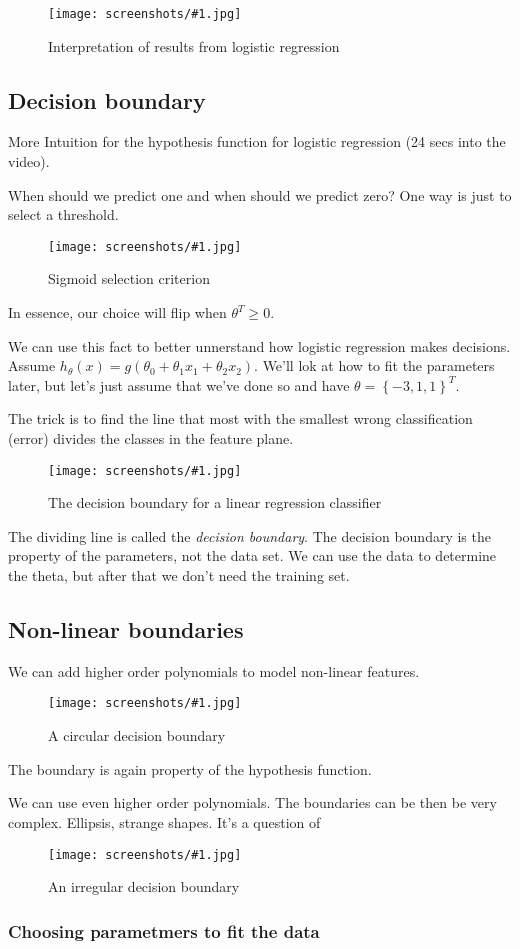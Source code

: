 \documentclass[a4, 12pt, english, USenglish]{scrreprt}
\newcommand{\zcreenshot}[3]{
\begin{figure}[htb]
\texttt{[image: screenshots/\#1.jpg]}
\label{#1}
\caption{#2}
\end{figure}}
\newcommand{\screenshot}[2]{
\begin{figure}[htb]
\texttt{[image: screenshots/\#1.jpg]}
\label{#1}
\caption{#2}
\end{figure}}
\newcommand{\braces}[1]{\ensuremath{\left\{{#1}\right\}}}
\newcommand{\idx}[1]{{\em #1}\index{#1}}
\begin{document}
\screenshot{logisticinterpretation}{Interpretation of results from
  logistic regression}

\subsection*{Decision boundary}

More Intuition for the hypothesis function for logistic regression (24
secs into the video).

When should we predict one and when should we predict zero?   One way
is just to select a threshold. 

\zcreenshot{sigmoid-selection-criterion}{Sigmoid selection criterion}{7cm}


In essence, our choice will flip when \(\theta^T \geq 0 \).

We can use this fact to better unnerstand how logistic regression
makes decisions.    Assume \(h_\theta(x) = g(\theta_0 + \theta_1 x_1 +
\theta_2 x_2) \).  We'll lok at how to fit the parameters later, but
let's just assume that we've done so  and have \(\theta =
\braces{-3,1,1}^T\).

The trick is to find the line that most with the smallest wrong
classification (error) divides the classes in the feature plane.

\screenshot{boundaryplot}{The decision boundary for a linear
  regression classifier}


The dividing line is called the \idx{decision boundary}.  The decision
boundary is the property of the parameters, not the data set.   We can
use the data to determine the theta, but after that we don't need the
training set.


\subsection*{Non-linear boundaries}

We can add higher order polynomials to model non-linear features.


\screenshot{circularboundary}{A circular decision boundary}

The boundary is again  property of the hypothesis function.

We can use even higher order polynomials.   The boundaries can be then
be very complex. Ellipsis, strange shapes.  It's a question of 

\screenshot{irregularboundary}{An irregular decision boundary}

\subsubsection*{Choosing parametmers to fit the data}
\end{document}
